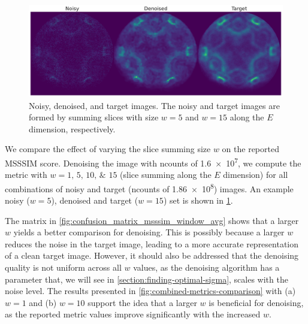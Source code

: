 \begin{figure}
    \centering
    \includegraphics[width=1\linewidth]{images/noisy_denoised_ref_16M_avg_bm3d.pdf}
    \caption{Noisy, denoised, and target images. The noisy and target images are formed by summing slices with size $w=5$ and $w=15$ along the $E$ dimension, respectively.}
    \label{fig:noisy-denoised-ref-16M-avg-bm3d}
\end{figure}

We compare the effect of varying the slice summing size $w$ on the reported \gls{MSSSIM} score. Denoising the image with \gls{ncounts} of \num{1.6e7}, we compute the metric with $w = \numlist{1;5;10;15}$ (slice summing along the $E$ dimension) for all combinations of noisy and target (\gls{ncounts} of \num{1.86e8}) images. An example noisy ($w = 5$), denoised and target ($w=15$) set is shown in \cref{fig:noisy-denoised-ref-16M-avg-bm3d}. 

The matrix in \cref{fig:confusion_matrix_msssim_window_avg} shows that a larger $w$ yields a better comparison for denoising.  This is possibly because a larger $w$ reduces the noise in the target image, leading to a more accurate representation of a clean target image. However, it should also be addressed that the denoising quality is not uniform across all $w$ values, as the denoising algorithm has a parameter that, we will see in \cref{section:finding-optimal-sigma}, scales with the noise level. The results presented in \cref{fig:combined-metrics-comparison} with (a) $w=1$ and (b) $w=10$ support the idea that a larger $w$ is beneficial for denoising, as the reported metric values improve significantly with the increased $w$.



